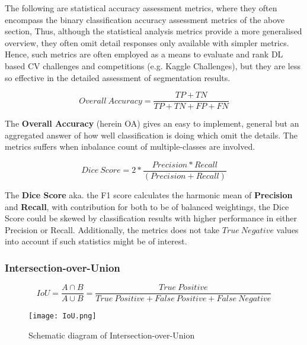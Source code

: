 \documentclass[11pt, a4paper, twoside]{report}
\begin{document}
The following are statistical accuracy assessment metrics, where they often encompass the binary classification accuracy assessment metrics of the above section, Thus, although the statistical analysis metrics provide a more generalised overview, they often omit detail responses only available with simpler metrics. Hence, such metrics are often employed as a means to evaluate and rank DL based CV challenges and competitions (e.g. Kaggle Challenges), but they are less so effective in the detailed assessment of segmentation results.\\\par

\begin{equation}
  Overall\ Accuracy = \frac{TP + TN}{TP + TN + FP + FN}
\end{equation}

The \textbf{Overall Accuracy} (herein OA) gives an easy to implement, general but an aggregated answer of how well classification is doing which omit the details. The metrics suffers when inbalance count of multiple-classes are involved.\\\par

\begin{equation}
  Dice\ Score = 2 * \frac{Precision * Recall}{(Precision + Recall)}
\end{equation}

The \textbf{Dice Score} aka. the F1 score calculates the harmonic mean of \textbf{Precision} and \textbf{Recall}, with contribution for both to be of balanced weightings, the Dice Score could be skewed by classification results with higher performance in either Precision or Recall. Additionally, the metrics does not take $True\ Negative$ values into account if such statistics might be of interest.\\\par

\subsubsection{Intersection-over-Union}\label{IoU}

\begin{equation}
  IoU = \frac{A \cap B}{A \cup B} = \frac{True\ Positive}{True\ Positive + False\ Positive + False\ Negative}
\end{equation}

\begin{figure}[H]
  \centering
  \texttt{[image: IoU.png]}
  \caption{Schematic diagram of Intersection-over-Union}
  \label{fig:IoU}
\end{figure}
\end{document}
